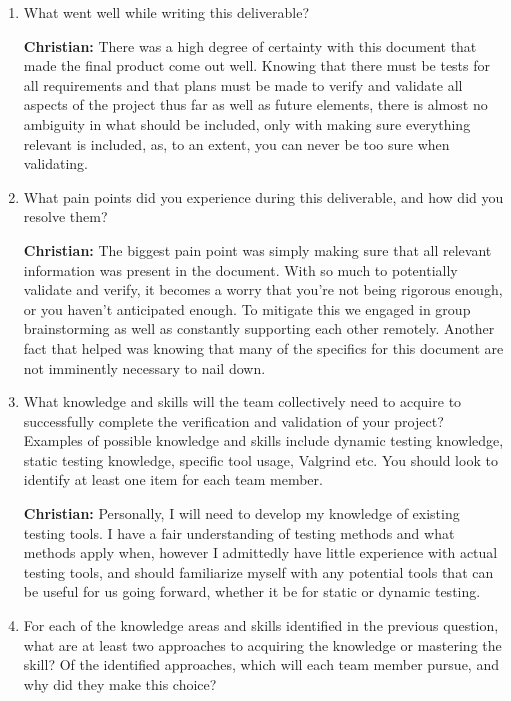 \documentclass[12pt, titlepage]{article}
\begin{document}
\begin{enumerate}
  \item What went well while writing this deliverable? 

  \textbf{Christian:} There was a high degree of certainty with this document that made the final product come out well. Knowing that there must be tests for all requirements and that plans must be made to verify and validate all aspects of the project thus far as well as future elements, there is almost no ambiguity in what should be included, only with making sure everything relevant is included, as, to an extent, you can never be too sure when validating.

  \item What pain points did you experience during this deliverable, and how
    did you resolve them?

  \textbf{Christian:} The biggest pain point was simply making sure that all relevant information was present in the document. With so much to potentially validate and verify, it becomes a worry that you're not being rigorous enough, or you haven't anticipated enough. To mitigate this we engaged in group brainstorming as well as constantly supporting each other remotely. Another fact that helped was knowing that many of the specifics for this document are not imminently necessary to nail down.

  \item What knowledge and skills will the team collectively need to acquire to
  successfully complete the verification and validation of your project?
  Examples of possible knowledge and skills include dynamic testing knowledge,
  static testing knowledge, specific tool usage, Valgrind etc.  You should look to
  identify at least one item for each team member.

  \textbf{Christian:} Personally, I will need to develop my knowledge of existing testing tools. I have a fair understanding of testing methods and what methods apply when, however I admittedly have little experience with actual testing tools, and should familiarize myself with any potential tools that can be useful for us going forward, whether it be for static or dynamic testing.

  \item For each of the knowledge areas and skills identified in the previous
  question, what are at least two approaches to acquiring the knowledge or
  mastering the skill?  Of the identified approaches, which will each team
  member pursue, and why did they make this choice?


\end{enumerate}
\end{document}
